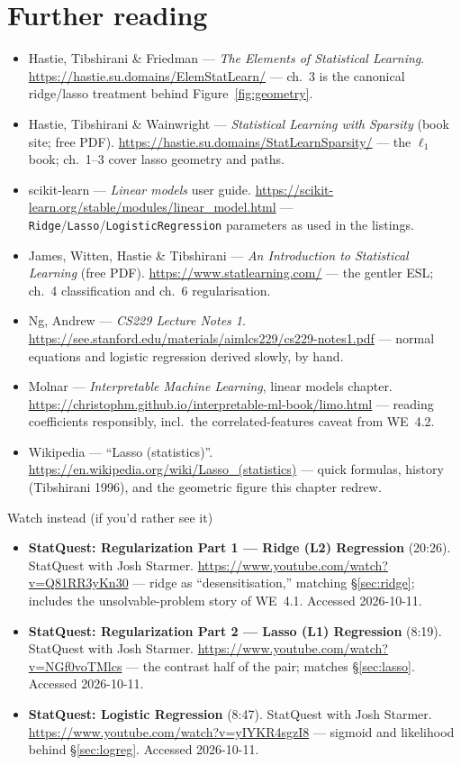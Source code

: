 \section*{Further reading}
\begin{itemize}
\item Hastie, Tibshirani \& Friedman --- \emph{The Elements of
  Statistical Learning}. \url{https://hastie.su.domains/ElemStatLearn/}
  --- ch.~3 is the canonical ridge/lasso treatment behind
  Figure~\ref{fig:geometry}.
\item Hastie, Tibshirani \& Wainwright --- \emph{Statistical Learning
  with Sparsity} (book site; free PDF). \url{https://hastie.su.domains/StatLearnSparsity/}
  --- the $\ell_1$ book; ch.~1--3 cover lasso geometry and paths.
\item scikit-learn --- \emph{Linear models} user guide.
  \url{https://scikit-learn.org/stable/modules/linear_model.html} ---
  \texttt{Ridge}/\texttt{Lasso}/\texttt{LogisticRegression} parameters as
  used in the listings.
\item James, Witten, Hastie \& Tibshirani --- \emph{An Introduction to
  Statistical Learning} (free PDF). \url{https://www.statlearning.com/}
  --- the gentler ESL; ch.~4 classification and ch.~6 regularisation.
\item Ng, Andrew --- \emph{CS229 Lecture Notes 1}.
  \url{https://see.stanford.edu/materials/aimlcs229/cs229-notes1.pdf} ---
  normal equations and logistic regression derived slowly, by hand.
\item Molnar --- \emph{Interpretable Machine Learning}, linear models
  chapter. \url{https://christophm.github.io/interpretable-ml-book/limo.html}
  --- reading coefficients responsibly, incl.\ the correlated-features
  caveat from WE~4.2.
\item Wikipedia --- ``Lasso (statistics)''.
  \url{https://en.wikipedia.org/wiki/Lasso_(statistics)} --- quick
  formulas, history (Tibshirani 1996), and the geometric figure this
  chapter redrew.
\end{itemize}

\begin{rulebox}{Watch instead (if you'd rather see it)}
\begin{itemize}
\item \textbf{StatQuest: Regularization Part 1 --- Ridge (L2)
  Regression} (20:26). StatQuest with Josh Starmer.
  \url{https://www.youtube.com/watch?v=Q81RR3yKn30} --- ridge as
  ``desensitisation,'' matching \S\ref{sec:ridge}; includes the
  unsolvable-problem story of WE~4.1. Accessed 2026-10-11.
\item \textbf{StatQuest: Regularization Part 2 --- Lasso (L1)
  Regression} (8:19). StatQuest with Josh Starmer.
  \url{https://www.youtube.com/watch?v=NGf0voTMlcs} --- the contrast half
  of the pair; matches \S\ref{sec:lasso}. Accessed 2026-10-11.
\item \textbf{StatQuest: Logistic Regression} (8:47). StatQuest with Josh
  Starmer. \url{https://www.youtube.com/watch?v=yIYKR4sgzI8} --- sigmoid
  and likelihood behind \S\ref{sec:logreg}. Accessed 2026-10-11.
\end{itemize}
\end{rulebox}

